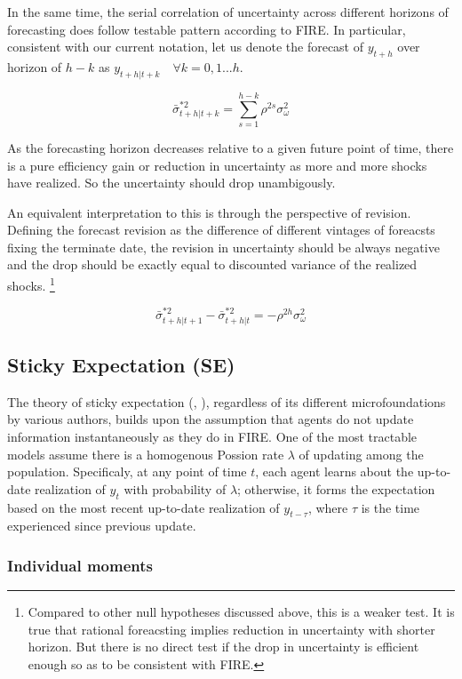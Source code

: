 \documentclass[]{article}
\begin{document}
In the same time, the serial correlation of uncertainty across different horizons of forecasting does follow testable pattern according to FIRE. In particular, consistent with our current notation, let us denote the forecast of $y_{t+h}$ over horizon of $h-k$ as $y_{t+h|t+k} \quad \forall k =0,1...h$. 

$$\bar \sigma^{*2}_{t+h|t+k} = \sum^{h-k}_{s=1}\rho^{2s} \sigma^2_{\omega}$$

As the forecasting horizon decreases relative to a given future point of time, there is a pure efficiency gain or reduction in uncertainty as more and more shocks have realized. So the uncertainty should drop unambigously. 

An equivalent interpretation to this is through the perspective of revision. Defining the forecast revision as the difference of different vintages of foreacsts fixing the terminate date, the revision in uncertainty should be always negative and the drop should be exactly equal to discounted variance of the realized shocks. \footnote{Compared to other null hypotheses discussed above, this is a weaker test. It is true that rational foreacsting implies reduction in uncertainty with shorter horizon. But there is no direct test if the drop in uncertainty is efficient enough so as to be consistent with FIRE. }

$$\bar \sigma^{*2}_{t+h|t+1} - \bar \sigma^{*2}_{t+h|t} = - \rho^{2h}\sigma^2_\omega$$


\subsection{Sticky Expectation (SE)}

The theory of sticky expectation (\cite{xx}, \cite{xx} ), regardless of its different microfoundations by various authors, builds upon the assumption that agents do not update information instantaneously as they do in FIRE. One of the most tractable models assume there is a homogenous Possion rate $\lambda$ of updating among the population. Specificaly, at any point of time $t$, each agent learns about the up-to-date realization of $y_t$ with probability of $\lambda$; otherwise, it forms the expectation based on the most recent up-to-date realization of $y_{t-\tau}$, where $\tau$ is the time experienced since previous update. 


\subsubsection{Individual moments} 
\end{document}
